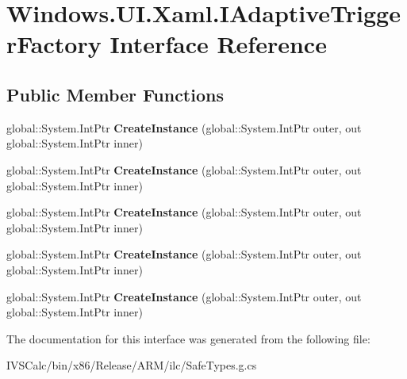 \hypertarget{interface_windows_1_1_u_i_1_1_xaml_1_1_i_adaptive_trigger_factory}{}\section{Windows.\+U\+I.\+Xaml.\+I\+Adaptive\+Trigger\+Factory Interface Reference}
\label{interface_windows_1_1_u_i_1_1_xaml_1_1_i_adaptive_trigger_factory}
\subsection*{Public Member Functions}
\begin{DoxyCompactItemize}
\item 
\mbox{\label{interface_windows_1_1_u_i_1_1_xaml_1_1_i_adaptive_trigger_factory_a2d83ff3b584510435e7721251299348b}} 
global\+::\+System.\+Int\+Ptr {\bfseries Create\+Instance} (global\+::\+System.\+Int\+Ptr outer, out global\+::\+System.\+Int\+Ptr inner)
\item 
\mbox{\label{interface_windows_1_1_u_i_1_1_xaml_1_1_i_adaptive_trigger_factory_a2d83ff3b584510435e7721251299348b}} 
global\+::\+System.\+Int\+Ptr {\bfseries Create\+Instance} (global\+::\+System.\+Int\+Ptr outer, out global\+::\+System.\+Int\+Ptr inner)
\item 
\mbox{\label{interface_windows_1_1_u_i_1_1_xaml_1_1_i_adaptive_trigger_factory_a2d83ff3b584510435e7721251299348b}} 
global\+::\+System.\+Int\+Ptr {\bfseries Create\+Instance} (global\+::\+System.\+Int\+Ptr outer, out global\+::\+System.\+Int\+Ptr inner)
\item 
\mbox{\label{interface_windows_1_1_u_i_1_1_xaml_1_1_i_adaptive_trigger_factory_a2d83ff3b584510435e7721251299348b}} 
global\+::\+System.\+Int\+Ptr {\bfseries Create\+Instance} (global\+::\+System.\+Int\+Ptr outer, out global\+::\+System.\+Int\+Ptr inner)
\item 
\mbox{\label{interface_windows_1_1_u_i_1_1_xaml_1_1_i_adaptive_trigger_factory_a2d83ff3b584510435e7721251299348b}} 
global\+::\+System.\+Int\+Ptr {\bfseries Create\+Instance} (global\+::\+System.\+Int\+Ptr outer, out global\+::\+System.\+Int\+Ptr inner)
\end{DoxyCompactItemize}


The documentation for this interface was generated from the following file\+:\begin{DoxyCompactItemize}
\item 
I\+V\+S\+Calc/bin/x86/\+Release/\+A\+R\+M/ilc/Safe\+Types.\+g.\+cs\end{DoxyCompactItemize}
